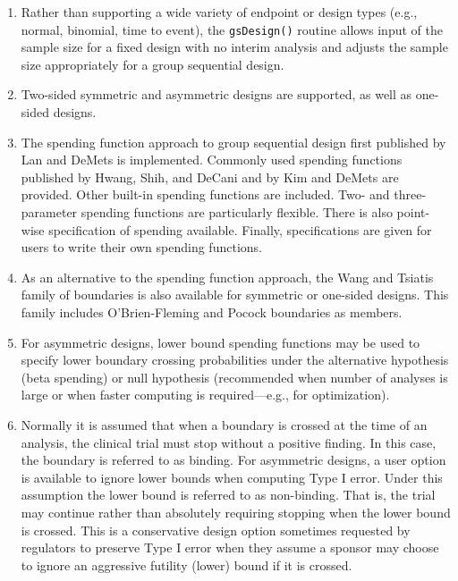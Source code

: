 \begin{enumerate}
\item Rather than supporting a wide variety of endpoint or design types (e.g.,
normal, binomial, time to event), the \texttt{gsDesign()} routine allows input
of the sample size for a fixed design with no interim analysis and adjusts the
sample size appropriately for a group sequential design.

\item Two-sided symmetric and asymmetric designs are supported, as well as
one-sided designs.

\item The spending function approach to group sequential design first
published by Lan and DeMets \cite{LanDeMets} is implemented. Commonly used
spending functions published by Hwang, Shih, and DeCani \cite{HwangShihDeCani}
and by Kim and DeMets \cite{KimDeMets} are provided. Other built-in spending
functions are included. Two- and three-parameter spending functions are
particularly flexible. There is also point-wise specification of spending
available. Finally, specifications are given for users to write their own
spending functions.

\item As an alternative to the spending function approach, the Wang and
Tsiatis \cite{WangTsiatis} family of boundaries is also available for
symmetric or one-sided designs. This family includes O'Brien-Fleming and
Pocock boundaries as members.

\item For asymmetric designs, lower bound spending functions may be used to
specify lower boundary crossing probabilities under the alternative hypothesis
(beta spending) or null hypothesis (recommended when number of analyses is
large or when faster computing is required---e.g., for optimization).

\item Normally it is assumed that when a boundary is crossed at the time of an
analysis, the clinical trial must stop without a positive finding. In this
case, the boundary is referred to as binding. For asymmetric designs, a user
option is available to ignore lower bounds when computing Type I error. Under
this assumption the lower bound is referred to as non-binding. That is, the
trial may continue rather than absolutely requiring stopping when the lower
bound is crossed. This is a conservative design option sometimes requested by
regulators to preserve Type I error when they assume a sponsor may choose to
ignore an aggressive futility (lower) bound if it is crossed.
\end{enumerate}

